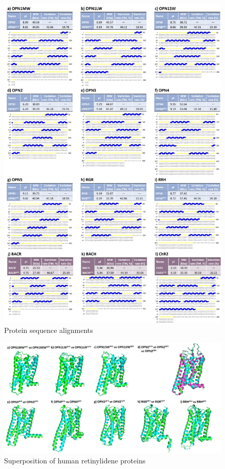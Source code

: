 \documentclass[fleqn,10pt,lineno]{manuscript}
\begin{document}
\begin{figure}[htbp]
	\centering
	\includegraphics[width=\linewidth]{Figures/sequences.jpg}
	\caption{Protein sequence alignments}
	\label{fig:sequences}
\end{figure}

\begin{figure}[htbp]
	\centering
	\includegraphics[width=\linewidth]{Figures/superposition-human.jpg}
	\caption{Superposition of human retinylidene proteins}
	\label{fig:humansup}
\end{figure}
\end{document}
